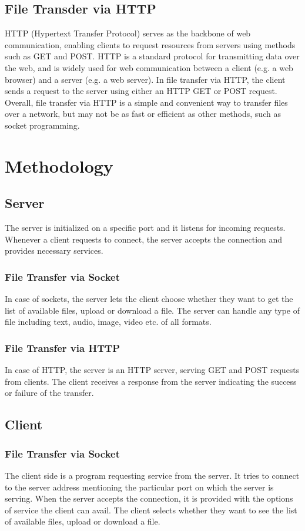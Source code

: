 \documentclass[11pt]{article}
\begin{document}
\subsection{File Transder via HTTP}
HTTP (Hypertext Transfer Protocol) serves as the backbone of web communication, enabling clients to request resources from servers using methods such as GET and POST. HTTP is a standard protocol
for transmitting data over the web, and is widely used for web communication between a client
(e.g. a web browser) and a server (e.g. a web server).
In file transfer via HTTP, the client sends a request to the server using either an HTTP GET
or POST request. Overall, file transfer via HTTP is a simple
and convenient way to transfer files over a network, but may not be as fast or efficient as other
methods, such as socket programming.

\section{Methodology}

\subsection{Server}
The server is initialized on a specific port and it listens for incoming requests. Whenever a client requests to connect, the server accepts the connection and provides necessary services.\\
\subsubsection{File Transfer via Socket}
In case of sockets, the server lets the client choose whether they want to get the list of available files, upload or download a file. The server can handle any type of file including text, audio, image, video etc. of all formats.
\subsubsection{File Transfer via HTTP}
In case of HTTP, the server is an HTTP server, serving GET and POST requests from clients. The client receives a response from the server indicating the success or failure
of the transfer.


\subsection{Client}
\subsubsection{File Transfer via Socket}
The client side is a program requesting service from the server. It tries to connect to the server address mentioning the particular port on which the server is serving. When the server accepts the connection, it is provided with the options of service the client can avail. The client selects whether they want to see the list of available files, upload or download a file.
\end{document}

